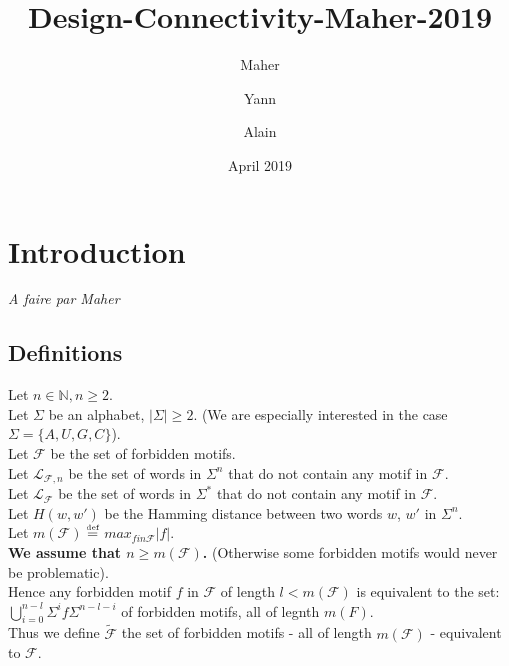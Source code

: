 \documentclass{article}
\title{Design-Connectivity-Maher-2019}
\author{Maher \and Yann \and Alain}
\date{April 2019}
\begin{document}
\maketitle

\newtheorem{theorem}{Theorem}
\newtheorem{proposition}[theorem]{Proposition}
\newtheorem{corollary}[theorem]{Corollary}
\newtheorem{definition}[theorem]{Definition}
\newtheorem{lemma}[theorem]{Lemma}
\newtheorem{remark}[theorem]{Remark}
\newtheorem{result}[theorem]{Result}
\newtheorem{example}[theorem]{Example}
\newtheorem*{idea*}{Idea}



\newcommand{\Nat}{\mathbb{N}}
\newcommand{\PosInt}{\mathbb{N}^*}
\newcommand{\Forb}{\mathcal{F}}
\newcommand{\ForbEqv}{\widetilde{\Forb}}
\newcommand{\Lang}[1]{\mathcal{L}_{#1}}
\newcommand{\LFn}{\Lang{\Forb, n}}
\newcommand{\Compl}[1]{\complement {#1}}
\newcommand{\Hamming}[2]{H(#1,#2)}
\newcommand{\EqDef}{\mathrel{\stackrel{\makebox[0pt]{\mbox{\normalfont\tiny def}}}{=}}}
\newcommand{\DeBruijn}[1]{\mathcal{DB}_{#1}}
	

\section{Introduction}
{\it A faire par Maher}

\subsection*{Definitions}

Let $n \in \Nat, n \geq 2$. \\
Let $\Sigma$ be an alphabet, $|\Sigma| \geq 2$. (We are especially interested in the case $\Sigma = \{A, U, G, C\}$). \\
Let $\Forb$ be the set of forbidden motifs. \\
Let $\LFn$ be the set of words in $\Sigma^n$ that do not contain any motif in $\Forb$. \\
Let $\Lang{\Forb}$ be the set of words in $\Sigma^*$ that do not contain any motif in $\Forb$. \\
Let $H(w,w')$ be the Hamming distance between two words $w$, $w'$ in $\Sigma^n$. \\

\noindent
Let $m(\Forb)$ $\EqDef$ $max_{f in \Forb} |f|$. \\
\textbf{We assume that $n \geq m(\Forb)$.} (Otherwise some forbidden motifs would never be problematic).\\
Hence any forbidden motif $f$ in $\Forb$ of length $l < m(\Forb)$ is equivalent to the set: $\bigcup_{i=0}^{n-l} \Sigma^i f \Sigma^{n-l-i}$ of forbidden motifs, all of legnth $m(F)$. \\
Thus we define $\ForbEqv$ the set of forbidden motifs - all of length $m(\Forb)$ - equivalent to $\Forb$.
\end{document}
